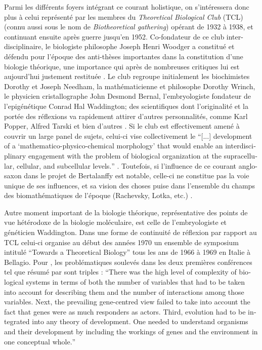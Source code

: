 Parmi les différents foyers intégrant ce courant holistique, on s'intéressera donc plus à celui représenté par les membres du \textit{Theoretical Biological Club} (TCL) (connu aussi sous le nom de \textit{Biotheoretical gathering}) opérant de 1932 à 1938, et continuant ensuite après guerre jusqu'en 1952. Co-fondateur de ce club inter-disciplinaire, le biologiste philosophe Joseph Henri Woodger a constitué et défendu pour l'époque des anti-thèses importantes dans la constitution d'une biologie théorique, une importance qui après de nombreuses critiques lui est aujourd'hui justement restituée \autocite{Nicholson2013}. Le club regroupe initialement les biochimistes Dorothy et Joseph Needham, la mathématicienne et philosophe Dorothy Wrinch, le physicien cristallographe John Desmond Bernal, l'embryologiste fondateur de l'epigénétique Conrad Hal Waddington; des scientifiques dont l'originalité et la portée des réflexions va rapidement attirer d'autres personnalités, comme Karl Popper, Alfred Tarski et bien d'autres \autocite[14-43]{Niemann2014}. Si le club est effectivement amené à couvrir un large panel de sujets, celui-ci vise collectivement le \foreignquote{english}{[...] development of a ‘mathematico-physico-chemical morphology’ that would enable an interdisciplinary engagement with the problem of biological organization at the supracellular, cellular, and subcellular levels.} \autocite [277]{Nicholson2013}. Toutefois, si l'influence de ce courant anglo-saxon dans le projet de Bertalanffy est notable, celle-ci ne constitue pas la voie unique de ses influences, et sa vision des choses puise dans l'ensemble du champs des biomathématiques de l'époque (Rachevsky, Lotka, etc.) \autocite[574-585]{Pouvreau2013}.

Autre moment important de la biologie théorique, représentative des points de vue hétérodoxe de la biologie moléculaire, est celle de l'embryologiste et généticien Waddington. Dans une forme de continuité de réflexion par rapport au TCL celui-ci organise au début des années 1970 un ensemble de symposium intitulé \enquote{Towards a Theoretical Biology} tous les ans de 1966 à 1969 en Italie à Bellagio. Pour \textcite[512-513]{Nanjundiah2010}, les problématiques soulevés dans les deux premières conférences tel que résumé par \textcite{Waddington1968} sont triples : \foreignquote{english}{There was the high level of complexity of biological systems in terms of both the number of variables that had to be taken into account for describing them and the number of interactions among those variables. Next, the prevailing gene-centred view failed to take into account the fact that genes were as much responders as actors. Third, evolution had to be integrated into any theory of development. One needed to understand organisms and their development by including the workings of genes and the environment in one conceptual whole.}


